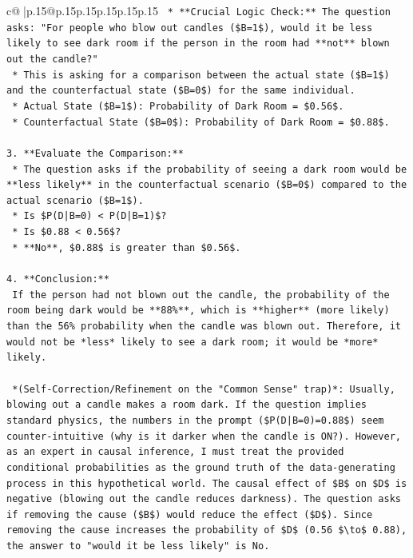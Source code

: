 \documentclass{article}
\begin{document}
{\begin{supertabular}{c@{$\;$}|p{.15\linewidth}@{}p{.15\linewidth}p{.15\linewidth}p{.15\linewidth}p{.15\linewidth}p{.15\linewidth}}
{{{\texttt{    *   **Crucial Logic Check:** The question asks: "For people who blow out candles (\$B=1\$), would it be less likely to see dark room if the person in the room had **not** blown out the candle?"} \\
\texttt{    *   This is asking for a comparison between the actual state (\$B=1\$) and the counterfactual state (\$B=0\$) for the same individual.} \\
\texttt{    *   Actual State (\$B=1\$): Probability of Dark Room = \$0.56\$.} \\
\texttt{    *   Counterfactual State (\$B=0\$): Probability of Dark Room = \$0.88\$.} \\
\\ 
\texttt{3.  **Evaluate the Comparison:**} \\
\texttt{    *   The question asks if the probability of seeing a dark room would be **less likely** in the counterfactual scenario (\$B=0\$) compared to the actual scenario (\$B=1\$).} \\
\texttt{    *   Is \$P(D|B=0) < P(D|B=1)\$?} \\
\texttt{    *   Is \$0.88 < 0.56\$?} \\
\texttt{    *   **No**, \$0.88\$ is greater than \$0.56\$.} \\
\\ 
\texttt{4.  **Conclusion:**} \\
\texttt{    If the person had not blown out the candle, the probability of the room being dark would be **88\%**, which is **higher** (more likely) than the 56\% probability when the candle was blown out. Therefore, it would not be *less* likely to see a dark room; it would be *more* likely.} \\
\\ 
\texttt{    *(Self{-}Correction/Refinement on the "Common Sense" trap)*: Usually, blowing out a candle makes a room dark. If the question implies standard physics, the numbers in the prompt (\$P(D|B=0)=0.88\$) seem counter{-}intuitive (why is it darker when the candle is ON?). However, as an expert in causal inference, I must treat the provided conditional probabilities as the ground truth of the data{-}generating process in this hypothetical world. The causal effect of \$B\$ on \$D\$ is negative (blowing out the candle reduces darkness). The question asks if removing the cause (\$B\$) would reduce the effect (\$D\$). Since removing the cause increases the probability of \$D\$ (0.56 \$\textbackslash{}to\$ 0.88), the answer to "would it be less likely" is No.} \\
}}}
\end{supertabular}}
\end{document}
